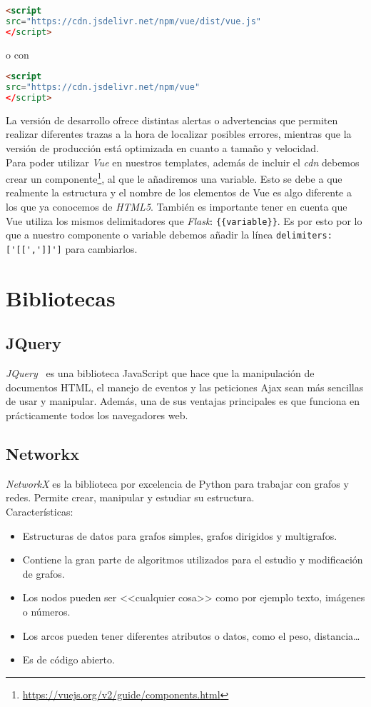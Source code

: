 \renewcommand{\lstlistingname}{Vue.js cdn}%
\renewcommand{\lstlistlistingname}{List of \lstlistingname s}
\begin{lstlisting}[language=html,caption={Versión de desarrollo.}]
<script
src="https://cdn.jsdelivr.net/npm/vue/dist/vue.js"
</script>
\end{lstlisting}
o con
\begin{lstlisting}[language=html,caption={Versión de producción.}]
<script
src="https://cdn.jsdelivr.net/npm/vue"
</script>
\end{lstlisting}
La versión de desarrollo ofrece distintas alertas o advertencias que permiten realizar diferentes trazas a la hora de localizar posibles errores, mientras que la versión de producción está optimizada en cuanto a tamaño y velocidad.
\\
Para poder utilizar \textit{Vue} en nuestros templates, además de incluir el \textit{cdn} debemos crear un componente\footnote{\url{https://vuejs.org/v2/guide/components.html}}, al que le añadiremos una variable. Esto se debe a que realmente la estructura y el nombre de los elementos de Vue es algo diferente a los que ya conocemos de \textit{HTML5}. También es importante tener en cuenta que Vue utiliza los mismos delimitadores que \textit{Flask}: \verb|{{variable}}|. Es por esto por lo que a nuestro componente o variable debemos añadir la línea \verb|delimiters:['[[',']]']| para cambiarlos.


\section{Bibliotecas}

\subsection{JQuery}
\textit{JQuery}~\cite{doc:jquery} es una biblioteca JavaScript que hace que la manipulación de documentos HTML, el manejo de eventos y las peticiones Ajax sean más sencillas de usar y manipular. Además, una de sus ventajas principales es que funciona en prácticamente todos los navegadores web.

\subsection{Networkx}
\textit{NetworkX} es la biblioteca por excelencia de Python para trabajar con grafos y redes. Permite crear, manipular y estudiar su estructura.
\\
Características:
\begin{itemize}
	\item Estructuras de datos para grafos simples, grafos dirigidos y multigrafos.
	\item Contiene la gran parte de algoritmos utilizados para el estudio y modificación de grafos.
	\item Los nodos pueden ser <<cualquier cosa>> como por ejemplo texto, imágenes o números.
	\item Los arcos pueden tener diferentes atributos o datos, como el peso, distancia\dots
	\item Es de código abierto.
\end{itemize}


